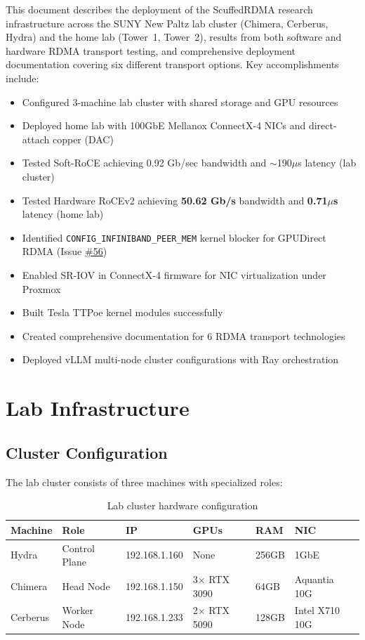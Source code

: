 \documentclass[10pt,letterpaper]{article}
\begin{document}
This document describes the deployment of the ScuffedRDMA research infrastructure across the SUNY New Paltz lab cluster (Chimera, Cerberus, Hydra) and the home lab (Tower~1, Tower~2), results from both software and hardware RDMA transport testing, and comprehensive deployment documentation covering six different transport options. Key accomplishments include:

\begin{itemize}[noitemsep]
    \item Configured 3-machine lab cluster with shared storage and GPU resources
    \item Deployed home lab with 100GbE Mellanox ConnectX-4 NICs and direct-attach copper (DAC)
    \item Tested Soft-RoCE achieving 0.92 Gb/sec bandwidth and $\sim$190$\mu$s latency (lab cluster)
    \item Tested Hardware RoCEv2 achieving \textbf{50.62 Gb/s} bandwidth and \textbf{0.71$\mu$s} latency (home lab)
    \item Identified \texttt{CONFIG\_INFINIBAND\_PEER\_MEM} kernel blocker for GPUDirect RDMA (Issue \href{https://github.com/ndg8743/ScuffedRDMA/issues/56}{\#56})
    \item Enabled SR-IOV in ConnectX-4 firmware for NIC virtualization under Proxmox
    \item Built Tesla TTPoe kernel modules successfully
    \item Created comprehensive documentation for 6 RDMA transport technologies
    \item Deployed vLLM multi-node cluster configurations with Ray orchestration
\end{itemize}

\section{Lab Infrastructure}

\subsection{Cluster Configuration}

The lab cluster consists of three machines with specialized roles:

\begin{table}[H]
\centering
\small
\begin{tabular}{@{}llllll@{}}
\toprule
\textbf{Machine} & \textbf{Role} & \textbf{IP} & \textbf{GPUs} & \textbf{RAM} & \textbf{NIC} \\
\midrule
Hydra & Control Plane & 192.168.1.160 & None & 256GB & 1GbE \\
Chimera & Head Node & 192.168.1.150 & 3$\times$ RTX 3090 & 64GB & Aquantia 10G \\
Cerberus & Worker Node & 192.168.1.233 & 2$\times$ RTX 5090 & 128GB & Intel X710 10G \\
\bottomrule
\end{tabular}
\caption{Lab cluster hardware configuration}
\end{table}
\end{document}
